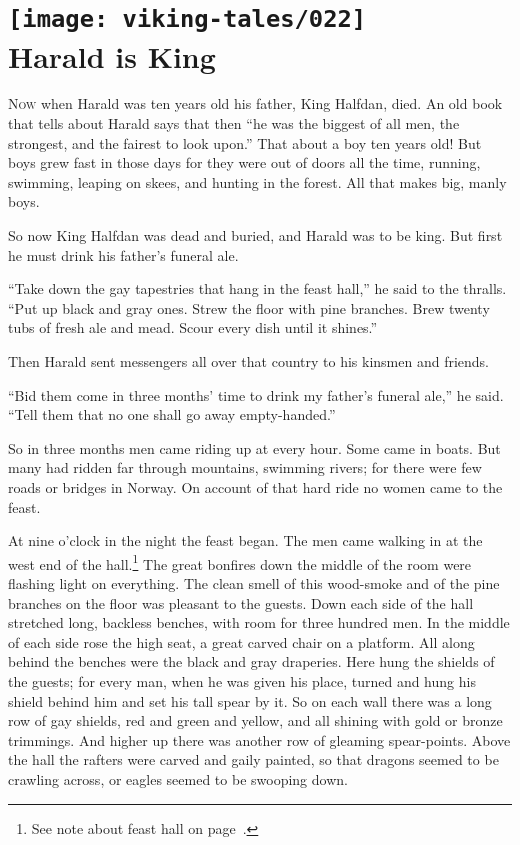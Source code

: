 \chapter[Harald is King]{
    \texttt{[image: viking-tales/022]}\\
    Harald is King}

\lettrine{N}{ow} when Harald was ten years old his father, King Halfdan,
died. An old book that tells about Harald says that then ``he was the
biggest of all men, the strongest, and the fairest to look upon.'' That
about a boy ten years old! But boys grew fast in those days for they were
out of doors all the time, running, swimming, leaping on skees, and
hunting in the forest. All that makes big, manly boys.

So now King Halfdan was dead and buried, and Harald was to be king. But
first he must drink his father's funeral ale.

``Take down the gay tapestries that hang in the feast hall,'' he said to
the thralls. ``Put up black and gray ones. Strew the floor with pine
branches. Brew twenty tubs of fresh ale and mead. Scour every dish until
it shines.''

Then Harald sent messengers all over that country to his kinsmen and
friends.

``Bid them come in three months' time to drink my father's funeral
ale,'' he said. ``Tell them that no one shall go away empty-handed.''

So in three months men came riding up at every hour. Some came in boats.
But many had ridden far through mountains, swimming rivers; for there
were few roads or bridges in Norway. On account of that hard ride no
women came to the feast.

At nine o'clock in the night the feast began. The men came walking in at
the west end of the hall.\footnote{See note about feast hall on
page~\pageref{feast-hall}.} The great bonfires down the middle of the
room were flashing light on everything. The clean smell of this
wood-smoke and of the pine branches on the floor was pleasant to the
guests. Down each side of the hall stretched long, backless benches, with
room for three hundred men. In the middle of each side rose the high
seat, a great carved chair on a platform. All along behind the benches
were the black and gray draperies. Here hung the shields of the guests;
for every man, when he was given his place, turned and hung his shield
behind him and set his tall spear by it. So on each wall there was a long
row of gay shields, red and green and yellow, and all shining with gold
or bronze trimmings. And higher up there was another row of gleaming
spear-points. Above the hall the rafters were carved and gaily painted,
so that dragons seemed to be crawling across, or eagles seemed to be
swooping down.

